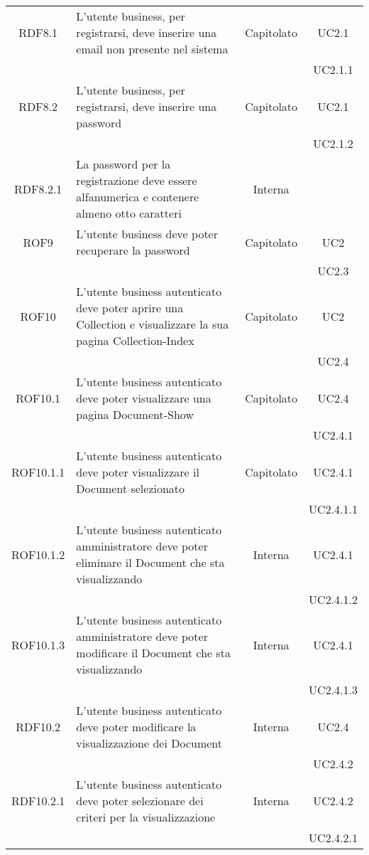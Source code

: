 \begin{longtable}{|c|p{6cm}|c|c|}
\midrule
RDF8.1
& L'utente business, per registrarsi, deve inserire una email non presente nel sistema
& Capitolato
& UC2.1\\
& & & UC2.1.1
\\

\midrule
RDF8.2
& L'utente business, per registrarsi, deve inserire una password
& Capitolato
& UC2.1\\
& & & UC2.1.2
\\

\midrule
RDF8.2.1
& La password per la registrazione deve essere alfanumerica e contenere almeno otto caratteri
& Interna
&
\\

\midrule
ROF9
& L'utente business deve poter recuperare la password
& Capitolato
& UC2\\
& & & UC2.3
\\

\midrule
ROF10
& L'utente business autenticato deve poter aprire una Collection e visualizzare la sua pagina Collection-Index
& Capitolato
& UC2\\
& & & UC2.4
\\

\midrule
ROF10.1
& L'utente business autenticato deve poter visualizzare una pagina Document-Show
& Capitolato
& UC2.4\\
& & & UC2.4.1
\\

\midrule
ROF10.1.1
& L'utente business autenticato deve poter visualizzare il Document selezionato
& Capitolato
& UC2.4.1\\
& & & UC2.4.1.1
\\

\midrule
ROF10.1.2
& L'utente business autenticato amministratore deve poter eliminare il Document che sta visualizzando
& Interna
& UC2.4.1\\
& & & UC2.4.1.2
\\

\midrule
ROF10.1.3
& L'utente business autenticato amministratore deve poter modificare il Document che sta visualizzando
& Interna
& UC2.4.1\\
& & & UC2.4.1.3
\\

\midrule
RDF10.2
& L'utente business autenticato deve poter modificare la visualizzazione dei Document
& Interna
& UC2.4\\
& & & UC2.4.2
\\

\midrule
RDF10.2.1
& L'utente business autenticato deve poter selezionare dei criteri per la visualizzazione
& Interna
& UC2.4.2\\
& & & UC2.4.2.1
\\


\end{longtable}
